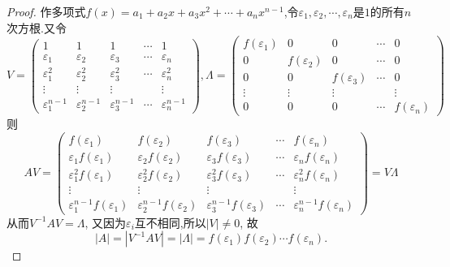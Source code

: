 \documentclass[../../main.tex]{subfiles}
\begin{document}
\begin{proof}
作多项式\(f(x)=a_1 + a_2x + a_3x^2+\cdots+a_nx^{n - 1}\),令\(\varepsilon_1,\varepsilon_2,\cdots,\varepsilon_n\)是\(1\)的所有\(n\)次方根.又令
\[
V = 
\begin{pmatrix}
1 & 1 & 1 & \cdots & 1\\
\varepsilon_1 & \varepsilon_2 & \varepsilon_3 & \cdots & \varepsilon_n\\
\varepsilon_1^2 & \varepsilon_2^2 & \varepsilon_3^2 & \cdots & \varepsilon_n^2\\
\vdots & \vdots & \vdots & & \vdots\\
\varepsilon_1^{n - 1} & \varepsilon_2^{n - 1} & \varepsilon_3^{n - 1} & \cdots & \varepsilon_n^{n - 1}
\end{pmatrix},
\Lambda = 
\begin{pmatrix}
f(\varepsilon_1) & 0 & 0 & \cdots & 0\\
0 & f(\varepsilon_2) & 0 & \cdots & 0\\
0 & 0 & f(\varepsilon_3) & \cdots & 0\\
\vdots & \vdots & \vdots & & \vdots\\
0 & 0 & 0 & \cdots & f(\varepsilon_n)
\end{pmatrix}
\]
则
\[
AV = 
\begin{pmatrix}
f(\varepsilon_1) & f(\varepsilon_2) & f(\varepsilon_3) & \cdots & f(\varepsilon_n)\\
\varepsilon_1f(\varepsilon_1) & \varepsilon_2f(\varepsilon_2) & \varepsilon_3f(\varepsilon_3) & \cdots & \varepsilon_nf(\varepsilon_n)\\
\varepsilon_1^2f(\varepsilon_1) & \varepsilon_2^2f(\varepsilon_2) & \varepsilon_3^2f(\varepsilon_3) & \cdots & \varepsilon_n^2f(\varepsilon_n)\\
\vdots & \vdots & \vdots & & \vdots\\
\varepsilon_1^{n - 1}f(\varepsilon_1) & \varepsilon_2^{n - 1}f(\varepsilon_2) & \varepsilon_3^{n - 1}f(\varepsilon_3) & \cdots & \varepsilon_n^{n - 1}f(\varepsilon_n)
\end{pmatrix}
= V\Lambda
\]
从而$V^{-1}AV=\Lambda$,
又因为\(\varepsilon_i\)互不相同,所以\(|V|\neq0\),
故
\[
|A|=|V^{-1}AV| = |\Lambda| = f(\varepsilon_1)f(\varepsilon_2)\cdots f(\varepsilon_n).
\]
\end{proof}
\end{document}
